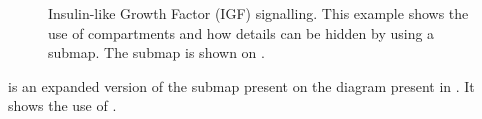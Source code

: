 \begin{figure}[t]
\begin{center}
\caption{Insulin-like Growth Factor (IGF) signalling. This example shows the use of compartments and how details can be hidden by using a submap. The submap is shown on .}\label{fig:insulin}
\end{center}
\end{figure}

 is an expanded version of the submap present on the diagram present in . It shows the use of .

